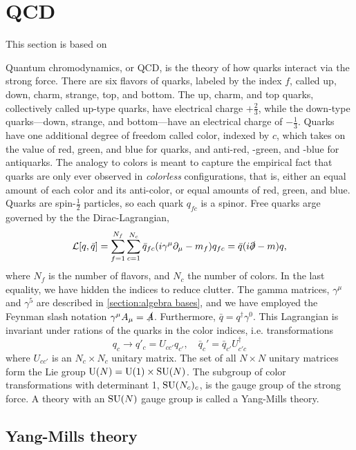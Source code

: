 \section{QCD}
\label{section:QCD}
This section is based on~\cite{Schwartz:QFT,Peskin:IntroQFT,Scherer2002IntroductionTC}

Quantum chromodynamics, or QCD, is the theory of how quarks interact via the strong force.
There are six flavors of quarks, labeled by the index $f$, called up, down, charm, strange, top, and bottom.
The up, charm, and top quarks, collectively called up-type quarks, have electrical charge $+\frac{2}{3}$, while the down-type quarks---down, strange, and bottom---have an electrical charge of $-\frac{1}{3}$.
Quarks have one additional degree of freedom called color, indexed by $c$, which takes on the value of red, green, and blue for quarks, and anti-red, -green, and -blue for antiquarks.
The analogy to colors is meant to capture the empirical fact that quarks are only ever observed in \emph{colorless} configurations, that is, either an equal amount of each color and its anti-color, or equal amounts of red, green, and blue.
Quarks are spin-$\frac{1}{2}$ particles, so each quark $q_{fc}$ is a spinor.
Free quarks arge governed by the the Dirac-Lagrangian,
\begin{equation}
    \mathcal{L}[q, \bar q] = \sum_{f=1}^{N_f} \sum_{c = 1}^{N_c} \bar q_{fc} (i\gamma^\mu \partial_\mu - m_f )q_{fc}
    = \bar q (i\slashed{\partial } - m)q,
\end{equation}
where $N_f$ is the number of flavors, and $N_c$ the number of colors.
In the last equality, we have hidden the indices to reduce clutter.
The gamma matrices, $\gamma^\mu$ and $\gamma^5$ are described in \autoref{section:algebra bases}, and we have employed the Feynman slash notation $\gamma^\mu A_\mu = \slashed A$.
Furthermore, $\bar q = q^\dagger \gamma^0$.
This Lagrangian is invariant under rations of the quarks in the color indices, i.e. transformations
\begin{equation}
    q_c \rightarrow q'_c = U_{cc'} q_{c'},
    \quad 
    \bar q_c' = \bar q_{c'} U_{c'c}^\dagger 
\end{equation}
where $U_{cc'}$ is an $N_c \times N_c$ unitary matrix.
The set of all $N\times N$ unitary matrices form the Lie group $\mathrm{U}(N) = \mathrm{U}(1)\times \mathrm{SU}(N)$.
The subgroup of color transformations with determinant 1, $\mathrm{SU}(N_c)_c$, is the gauge group of the strong force.
A theory with an $\mathrm{SU}(N)$ gauge group is called a Yang-Mills theory.

\subsection*{Yang-Mills theory}

